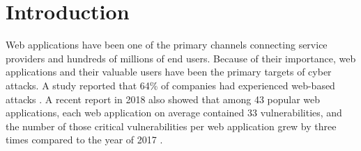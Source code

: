 \section{Introduction}
\label{xsym:s:intro}
Web applications have been one of the primary channels connecting service providers and hundreds of millions of end users.
Because of their importance, web applications and their valuable users have been the primary targets of cyber attacks.
A study reported that 64\% of companies had experienced web-based attacks \cite{cyberattack}.
A recent report in 2018 also showed that among 43 popular web applications, each web application on average contained 33 vulnerabilities, and the number of those critical vulnerabilities per web application grew by three times compared to the year of 2017 \cite{webvul}.

